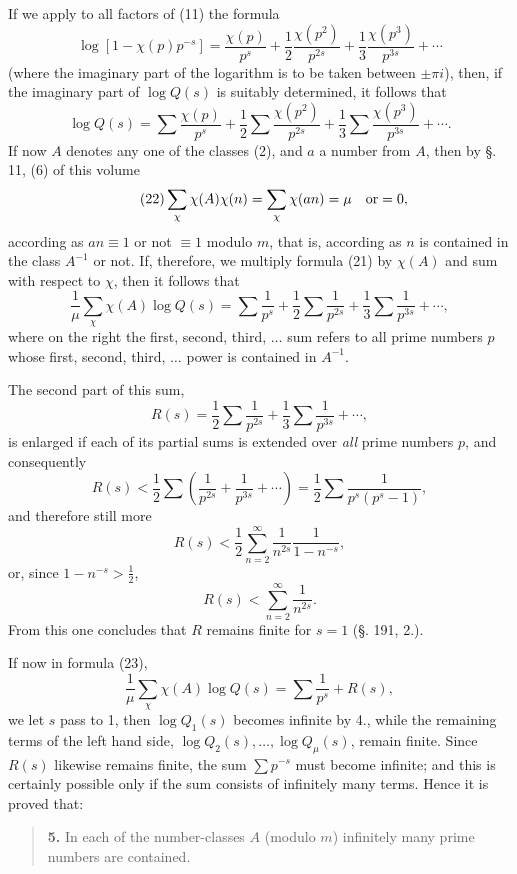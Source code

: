 \documentclass[11pt]{article}
\begin{document}
If we apply to all factors of (11) the formula
\[
\log[1-\chi(p)p^{-s}]
=\frac{\chi(p)}{p^s}+\frac12\frac{\chi(p^2)}{p^{2s}}+\frac13\frac{\chi(p^3)}{p^{3s}}+\cdots
\]
(where the imaginary part of the logarithm is to be taken between $\pm\pi i$), then, if the imaginary part of $\log Q(s)$ is suitably determined, it follows that
\begin{equation}\tag{21}
\log Q(s)=\sum\frac{\chi(p)}{p^s}+\frac12\sum\frac{\chi(p^2)}{p^{2s}}+\frac13\sum\frac{\chi(p^3)}{p^{3s}}+\cdots .
\end{equation}
If now $A$ denotes any one of the classes (2), and $a$ a number from $A$, then by §. 11, (6) of this volume
\begin{equation}\tag{22}
\sum_\chi \chi(A)\chi(n)=\sum_\chi \chi(an)=\mu\quad\hbox{or}=0,
\end{equation}
according as $an\equiv1$ or not $\equiv1$ modulo $m$, that is, according as $n$ is contained in the class $A^{-1}$ or not. If, therefore, we multiply formula (21) by $\chi(A)$ and sum with respect to $\chi$, then it follows that
\begin{equation}\tag{23}
\frac1\mu\sum_\chi \chi(A)\log Q(s)=
\sum\frac1{p^s}+\frac12\sum\frac1{p^{2s}}+\frac13\sum\frac1{p^{3s}}+\cdots,
\end{equation}
where on the right the first, second, third, $\ldots$ sum refers to all prime numbers $p$ whose first, second, third, $\ldots$ power is contained in $A^{-1}$.

The second part of this sum,
\[
R(s)=\frac12\sum\frac1{p^{2s}}+\frac13\sum\frac1{p^{3s}}+\cdots,
\]
is enlarged if each of its partial sums is extended over \emph{all} prime numbers $p$, and consequently
\[
R(s)<\frac12\sum\left(\frac1{p^{2s}}+\frac1{p^{3s}}+\cdots\right)
=\frac12\sum\frac1{p^s(p^s-1)},
\]
and therefore still more
\[
R(s)<\frac12\sum_{n=2}^{\infty}\frac1{n^{2s}}\frac1{1-n^{-s}},
\]
or, since $1-n^{-s}>\frac12$,
\[
R(s)<\sum_{n=2}^{\infty}\frac1{n^{2s}}.
\]
From this one concludes that $R$ remains finite for $s=1$ (§. 191, 2.).

If now in formula (23),
\[
\frac1\mu\sum_\chi \chi(A)\log Q(s)=\sum\frac1{p^s}+R(s),
\]
we let $s$ pass to 1, then $\log Q_1(s)$ becomes infinite by 4., while the remaining terms of the left hand side, $\log Q_2(s),\ldots,\log Q_\mu(s)$, remain finite. Since $R(s)$ likewise remains finite, the sum $\sum p^{-s}$ must become infinite; and this is certainly possible only if the sum consists of infinitely many terms. Hence it is proved that:

\begin{quote}
\textbf{5.} In each of the number-classes $A$ (modulo $m$) infinitely many prime numbers are contained.
\end{quote}
\end{document}
